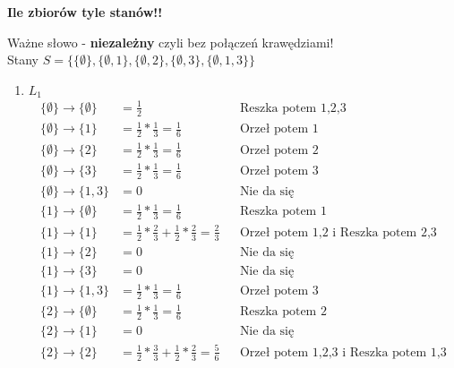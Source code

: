 \documentclass[a4paper,12pt]{article}
\theoremstyle{definition}%
\theoremstyle{definition}
\theoremstyle{problem}
\begin{document}
\begin{enumerate}[label=\alph*)]
\textbf{Ile zbiorów tyle stanów!!}
\begin{figure}[H]
\centering
{}
\end{figure}
Ważne słowo - \textbf{niezależny} czyli bez połączeń krawędziami!\\
Stany $S=\{\{\emptyset\},\{\emptyset,1\},\{\emptyset,2\},\{\emptyset,3\},\{\emptyset,1,3\} \}$
\begin{enumerate}
\item $L_1$
\begin{align*}
\{\emptyset\}\rightarrow \{\emptyset\} &=\frac{1}{2} &&\text{Reszka potem 1,2,3}\\
\{\emptyset\}\rightarrow \{1\} &=\frac{1}{2}*\frac{1}{3}=\frac{1}{6} &&\text{Orzeł potem 1}\\
\{\emptyset\}\rightarrow \{2\} &=\frac{1}{2}*\frac{1}{3}=\frac{1}{6} &&\text{Orzeł potem 2}\\
\{\emptyset\}\rightarrow \{3\} &=\frac{1}{2}*\frac{1}{3}=\frac{1}{6} &&\text{Orzeł potem 3}\\
\{\emptyset\}\rightarrow \{1,3\} &=0 &&\text{Nie da się}\\
\{1\}\rightarrow \{\emptyset\} &= \frac{1}{2}*\frac{1}{3}=\frac{1}{6}&&\text{Reszka potem 1}\\
\{1\}\rightarrow \{1\} &= \frac{1}{2}*\frac{2}{3}+\frac{1}{2}*\frac{2}{3}=\frac{2}{3}&&\text{Orzeł potem 1,2 i Reszka potem 2,3}\\
\{1\}\rightarrow \{2\} &= 0&&\text{Nie da się}\\
\{1\}\rightarrow \{3\} &= 0&&\text{Nie da się}\\
\{1\}\rightarrow \{1,3\} &= \frac{1}{2}*\frac{1}{3}=\frac{1}{6} &&\text{Orzeł potem 3}\\
\{2\}\rightarrow \{\emptyset\} &= \frac{1}{2}*\frac{1}{3}=\frac{1}{6} &&\text{Reszka potem 2}\\
\{2\}\rightarrow \{1\} &= 0&&\text{Nie da się}\\
\{2\}\rightarrow \{2\} &= \frac{1}{2}*\frac{3}{3}+\frac{1}{2}*\frac{2}{3}=\frac{5}{6}&&\text{Orzeł potem 1,2,3 i Reszka potem 1,3}\\

\end{align*}
\end{enumerate}
\end{enumerate}
\end{document}

